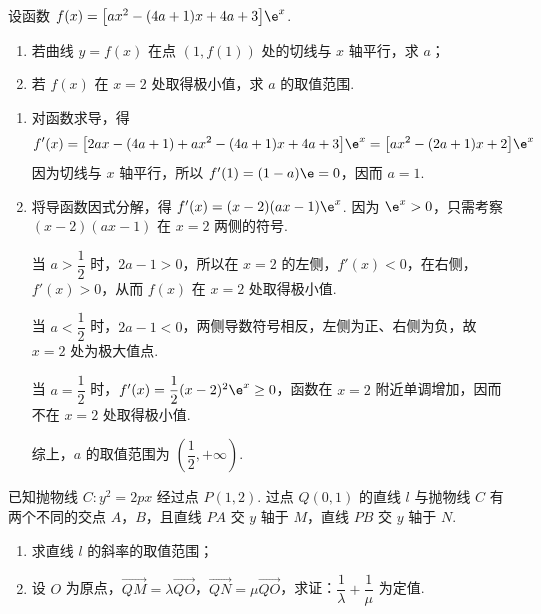 \begin{problem}
设函数 \(f(x)=\bigl[ax^2-(4a+1)x+4a+3\bigr]\e^x\).

\begin{enumerate}
    \item 若曲线 \(y=f(x)\) 在点 \((1,f(1))\) 处的切线与 \(x\) 轴平行，求 \(a\)；
    \item 若 \(f(x)\) 在 \(x=2\) 处取得极小值，求 \(a\) 的取值范围.
\end{enumerate}
\end{problem}

\begin{solution}
\begin{enumerate}
    \item 对函数求导，得
    \[
    f'(x)=\bigl[2ax-(4a+1)+ax^2-(4a+1)x+4a+3\bigr]\e^x
    =\bigl[ax^2-(2a+1)x+2\bigr]\e^x
    \]
    因为切线与 \(x\) 轴平行，所以 \(f'(1)=(1-a)\e=0\)，因而 \(a=1\).
    \item 将导函数因式分解，得 \(f'(x)=(x-2)(ax-1)\e^x\).
    因为 \(\e^x>0\)，只需考察 \((x-2)(ax-1)\) 在 \(x=2\) 两侧的符号.

    当 \(a>\dfrac12\) 时，\(2a-1>0\)，所以在 \(x=2\) 的左侧，\(f'(x)<0\)，在右侧，\(f'(x)>0\)，从而 \(f(x)\) 在 \(x=2\) 处取得极小值.

    当 \(a<\dfrac12\) 时，\(2a-1<0\)，两侧导数符号相反，左侧为正、右侧为负，故 \(x=2\) 处为极大值点.

    当 \(a=\dfrac12\) 时，\(f'(x)=\dfrac12(x-2)^2\e^x\ge0\)，函数在 \(x=2\) 附近单调增加，因而不在 \(x=2\) 处取得极小值.

    综上，\(a\) 的取值范围为 \(\left(\dfrac12,+\infty\right)\).
\end{enumerate}
\end{solution}

\begin{problem}
已知抛物线 \(C:y^2=2px\) 经过点 \(P(1,2)\). 过点 \(Q(0,1)\) 的直线 \(l\) 与抛物线 \(C\) 有两个不同的交点 \(A\)，\(B\)，且直线 \(PA\) 交 \(y\) 轴于 \(M\)，直线 \(PB\) 交 \(y\) 轴于 \(N\).

\begin{enumerate}
    \item 求直线 \(l\) 的斜率的取值范围；
    \item 设 \(O\) 为原点，\(\overrightarrow{QM}=\lambda\overrightarrow{QO}\)，\(\overrightarrow{QN}=\mu\overrightarrow{QO}\)，求证：\(\dfrac1\lambda+\dfrac1\mu\) 为定值.
\end{enumerate}
\end{problem}

